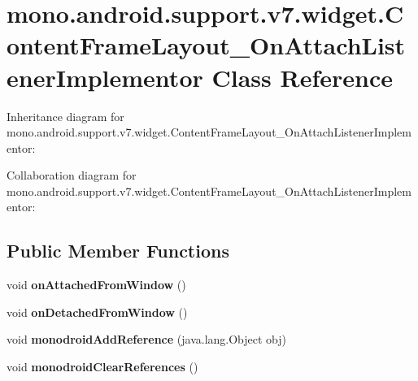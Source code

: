 \hypertarget{classmono_1_1android_1_1support_1_1v7_1_1widget_1_1_content_frame_layout___on_attach_listener_implementor}{}\section{mono.\+android.\+support.\+v7.\+widget.\+Content\+Frame\+Layout\+\_\+\+On\+Attach\+Listener\+Implementor Class Reference}
\label{classmono_1_1android_1_1support_1_1v7_1_1widget_1_1_content_frame_layout___on_attach_listener_implementor}


Inheritance diagram for mono.\+android.\+support.\+v7.\+widget.\+Content\+Frame\+Layout\+\_\+\+On\+Attach\+Listener\+Implementor\+:


Collaboration diagram for mono.\+android.\+support.\+v7.\+widget.\+Content\+Frame\+Layout\+\_\+\+On\+Attach\+Listener\+Implementor\+:
\subsection*{Public Member Functions}
\begin{DoxyCompactItemize}
\item 
\mbox{\label{classmono_1_1android_1_1support_1_1v7_1_1widget_1_1_content_frame_layout___on_attach_listener_implementor_aebc22e6de85c5f2e510d674d2fdc2d7e}} 
void {\bfseries on\+Attached\+From\+Window} ()
\item 
\mbox{\label{classmono_1_1android_1_1support_1_1v7_1_1widget_1_1_content_frame_layout___on_attach_listener_implementor_ae3cd180a0da45d1e2f553cc2d63a68af}} 
void {\bfseries on\+Detached\+From\+Window} ()
\item 
\mbox{\label{classmono_1_1android_1_1support_1_1v7_1_1widget_1_1_content_frame_layout___on_attach_listener_implementor_a66402d6035c251dd704de8c08cb0c3e3}} 
void {\bfseries monodroid\+Add\+Reference} (java.\+lang.\+Object obj)
\item 
\mbox{\label{classmono_1_1android_1_1support_1_1v7_1_1widget_1_1_content_frame_layout___on_attach_listener_implementor_a5aeae467b8295109705d686c3e7664c7}} 
void {\bfseries monodroid\+Clear\+References} ()
\end{DoxyCompactItemize}
